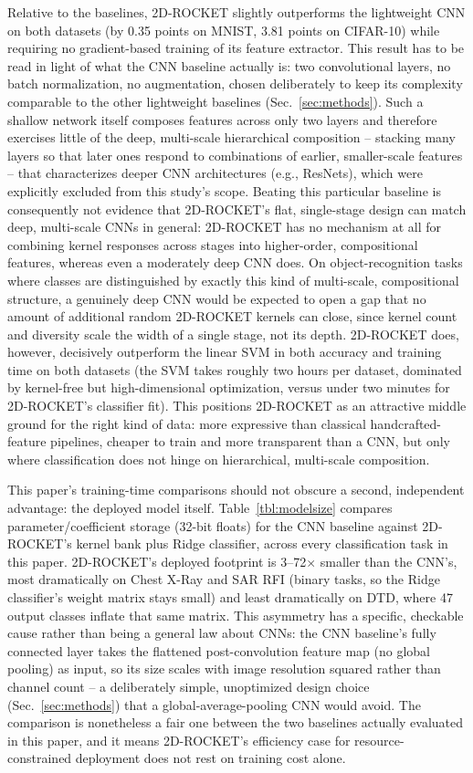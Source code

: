 \documentclass[a4paper,fleqn]{cas-sc}
\begin{document}
Relative to the baselines, 2D-ROCKET slightly outperforms the lightweight CNN on both datasets (by 0.35 points on MNIST, 3.81 points on CIFAR-10) while requiring no gradient-based training of its feature extractor. This result has to be read in light of what the CNN baseline actually is: two convolutional layers, no batch normalization, no augmentation, chosen deliberately to keep its complexity comparable to the other lightweight baselines (Sec.~\ref{sec:methods}). Such a shallow network itself composes features across only two layers and therefore exercises little of the deep, multi-scale hierarchical composition -- stacking many layers so that later ones respond to combinations of earlier, smaller-scale features -- that characterizes deeper CNN architectures (e.g., ResNets), which were explicitly excluded from this study's scope. Beating this particular baseline is consequently not evidence that 2D-ROCKET's flat, single-stage design can match deep, multi-scale CNNs in general: 2D-ROCKET has no mechanism at all for combining kernel responses across stages into higher-order, compositional features, whereas even a moderately deep CNN does. On object-recognition tasks where classes are distinguished by exactly this kind of multi-scale, compositional structure, a genuinely deep CNN would be expected to open a gap that no amount of additional random 2D-ROCKET kernels can close, since kernel count and diversity scale the width of a single stage, not its depth. 2D-ROCKET does, however, decisively outperform the linear SVM in both accuracy and training time on both datasets (the SVM takes roughly two hours per dataset, dominated by kernel-free but high-dimensional optimization, versus under two minutes for 2D-ROCKET's classifier fit). This positions 2D-ROCKET as an attractive middle ground for the right kind of data: more expressive than classical handcrafted-feature pipelines, cheaper to train and more transparent than a CNN, but only where classification does not hinge on hierarchical, multi-scale composition.

This paper's training-time comparisons should not obscure a second, independent advantage: the deployed model itself. Table~\ref{tbl:modelsize} compares parameter/coefficient storage (32-bit floats) for the CNN baseline against 2D-ROCKET's kernel bank plus Ridge classifier, across every classification task in this paper. 2D-ROCKET's deployed footprint is 3--72$\times$ smaller than the CNN's, most dramatically on Chest X-Ray and SAR RFI (binary tasks, so the Ridge classifier's weight matrix stays small) and least dramatically on DTD, where 47 output classes inflate that same matrix. This asymmetry has a specific, checkable cause rather than being a general law about CNNs: the CNN baseline's fully connected layer takes the flattened post-convolution feature map (no global pooling) as input, so its size scales with image resolution squared rather than channel count -- a deliberately simple, unoptimized design choice (Sec.~\ref{sec:methods}) that a global-average-pooling CNN would avoid. The comparison is nonetheless a fair one between the two baselines actually evaluated in this paper, and it means 2D-ROCKET's efficiency case for resource-constrained deployment does not rest on training cost alone.
\end{document}
